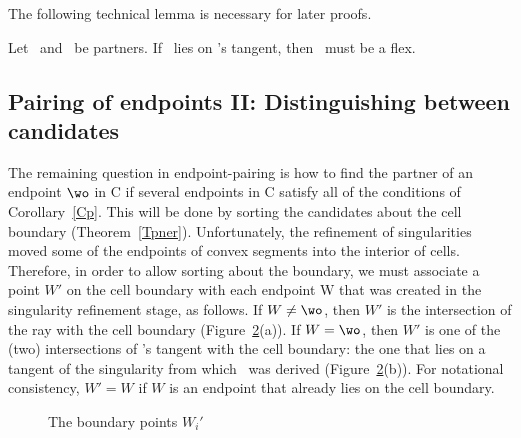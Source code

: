 \begin{figure}[htbp]\vspace{2.25in}\caption{}\label{3.12}\end{figure}

\noindent The following technical lemma is necessary for later proofs.
%
\begin{lemma}[{\cite{jj}}]   %
\label{Ll}
Let \wo\ and \wt\ be partners.
If \wt\ lies on \wo's tangent, then \wo\ must be a flex.
\end{lemma}

\subsection{Pairing of endpoints II: Distinguishing between candidates}
\label{sspII}

The remaining question in endpoint-pairing is how to find the partner 
of an endpoint $\wo$ in C if several endpoints in C satisfy all of the 
conditions of Corollary~\ref{Cp}.  
This will be done by sorting the candidates about the cell boundary
(Theorem~\ref{Tpner}).
Unfortunately, the refinement of singularities moved some of the endpoints 
of convex segments into the interior of cells.  
Therefore, in order to allow sorting about the boundary, we must associate 
a point $W'$ on the cell boundary with each endpoint W that was created 
in the singularity refinement stage, as follows.
If $W \neq \wo$,  then $W'$ is the intersection of the ray  
with the cell boundary (Figure~\ref{3.J}(a)).
If $W = \wo$, then $W'$ is one of the (two) intersections of \wo's tangent with
the cell boundary: the one that lies on a tangent of the singularity
from which \wo\ was derived (Figure~\ref{3.J}(b)).
For notational consistency, $W' = W$ if $W$ is an endpoint that already 
lies on the cell boundary.

\begin{figure}[htbp]\vspace{3.5in}\caption{The boundary points $W_{i}'$}\label{3.J}\end{figure}

